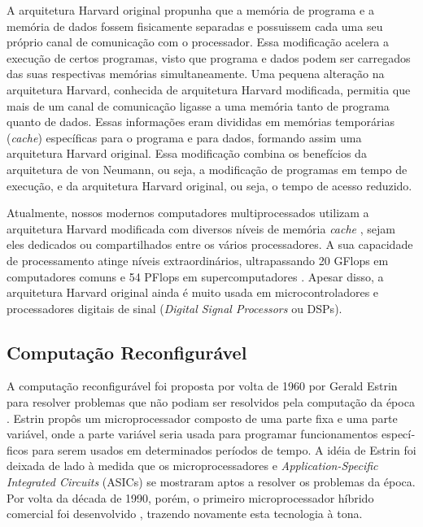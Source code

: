 \documentclass[11pt,a4paper,oneside]{book}
\begin{document}
A arquitetura Harvard original propunha que a mem\'oria de programa e a mem\'oria de dados fossem fisicamente separadas e possuissem cada uma seu pr\'oprio canal de comunica\c{c}\~ao com o processador.
Essa modifica\c{c}\~ao acelera a execu\c{c}\~ao de certos programas, visto que programa e dados podem ser carregados das suas respectivas mem\'orias simultaneamente.
Uma pequena altera\c{c}\~ao na arquitetura Harvard, conhecida de arquitetura Harvard modificada, permitia que mais de um canal de comunica\c{c}\~ao ligasse a uma mem\'oria tanto de programa quanto de dados.
Essas informa\c{c}\~oes eram divididas em mem\'orias tempor\'arias (\textit{cache}) espec\'i­ficas para o programa e para dados, formando assim uma arquitetura Harvard original.
Essa modifica\c{c}\~ao combina os benef\'i­cios da arquitetura de von Neumann, ou seja, a modifica\c{c}\~ao de programas em tempo de execu\c{c}\~ao, e da arquitetura Harvard original, ou seja, o tempo de acesso reduzido.

Atualmente, nossos modernos computadores multiprocessados utilizam a arquitetura Harvard modificada com diversos n\'i­veis de mem\'oria \textit{cache} \cite{Hennessy2011}, sejam eles dedicados ou compartilhados entre os v\'arios processadores.
A sua capacidade de processamento atinge n\'i­veis extraordin\'arios, ultrapassando 20 GFlops em computadores comuns \cite{MaxxPI2013} e 54 PFlops em supercomputadores \cite{Top5002013}.
Apesar disso, a arquitetura Harvard original ainda \'e muito usada em microcontroladores e processadores digitais de sinal (\textit{Digital Signal Processors} ou DSPs).


\subsection{Computa\c{c}\~ao Reconfigur\'avel}
\label{ss:computacao_reconfiguravel}

A computa\c{c}\~ao reconfigur\'avel foi proposta por volta de 1960 por Gerald Estrin para resolver problemas que n\~ao podiam ser resolvidos pela computa\c{c}\~ao da \'epoca \cite{Estrin2002}.
Estrin prop\^os um microprocessador composto de uma parte fixa e uma parte vari\'avel, onde a parte vari\'avel seria usada para programar funcionamentos espec\'i­ficos para serem usados em determinados per\'i­odos de tempo.
A id\'eia de Estrin foi deixada de lado \`a medida que os microprocessadores e \textit{Application-Specific Integrated Circuits} (ASICs) se mostraram aptos a resolver os problemas da \'epoca.
Por volta da d\'ecada de 1990, por\'em, o primeiro microprocessador h\'i­brido comercial foi desenvolvido \cite{Estrin2002}, trazendo novamente esta tecnologia \`a tona.
\end{document}
